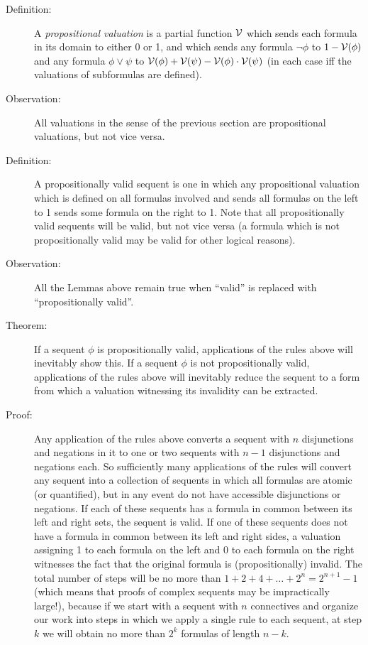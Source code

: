 \documentclass[12pt]{book}
\begin{document}
\begin{description}

\item[Definition:] A {\em propositional valuation\/} is a partial
function $\cal V$ which sends each formula in its domain to either 0
or 1, and which sends any formula $\neg\phi$ to $1-{\cal V}(\phi)$ and
any formula $\phi \vee \psi$ to ${\cal V}(\phi) + {\cal V}(\psi) -
{\cal V}(\phi)\cdot{\cal V}(\psi)$ (in each case iff the valuations of
subformulas are defined).

\item[Observation:] All valuations in the sense of the previous
section are propositional valuations, but not vice versa.

\item[Definition:] A propositionally valid sequent is one in which any
propositional valuation which is defined on all formulas involved and
sends all formulas on the left to 1 sends some formula on the right to
1.  Note that all propositionally valid sequents will be valid, but
not vice versa (a formula which is not propositionally valid may be
valid for other logical reasons).

\item[Observation:]  All the Lemmas above remain true when ``valid''
is replaced with ``propositionally valid''.

\end{description}

\begin{description}

\item[Theorem:] If a sequent $\phi$ is propositionally valid,
applications of the rules above will inevitably show this.  If a
sequent $\phi$ is not propositionally valid, applications of the rules
above will inevitably reduce the sequent to a form from which a
valuation witnessing its invalidity can be extracted.

\item[Proof:] Any application of the rules above converts a sequent
with $n$ disjunctions and negations in it to one or two sequents with
$n-1$ disjunctions and negations each.  So sufficiently many
applications of the rules will convert any sequent into a collection
of sequents in which all formulas are atomic (or quantified), but in
any event do not have accessible disjunctions or negations.  If each
of these sequents has a formula in common between its left and right
sets, the sequent is valid.  If one of these sequents does not have a
formula in common between its left and right sides, a valuation
assigning 1 to each formula on the left and 0 to each formula on the
right witnesses the fact that the original formula is
(propositionally) invalid.  The total number of steps will be no more
than $1+2+4+\ldots+2^n = 2^{n+1}-1$ (which means that proofs of
complex sequents may be impractically large!), because if we start
with a sequent with $n$ connectives and organize our work into steps
in which we apply a single rule to each sequent, at step $k$ we will
obtain no more than $2^k$ formulas of length $n-k$.

\end{description}
\end{document}
